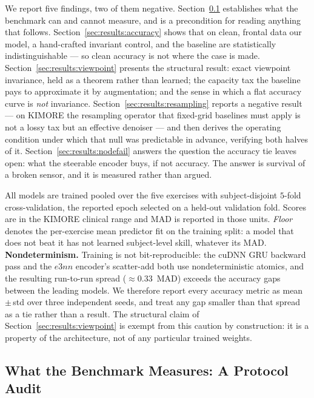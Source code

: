\documentclass[10pt,journal]{IEEEtran}
\begin{document}
We report five findings, two of them negative. Section~\ref{sec:results:protocol} establishes what
the benchmark can and cannot measure, and is a precondition for reading anything that follows.
Section~\ref{sec:results:accuracy} shows that on clean, frontal data our model, a hand-crafted
invariant control, and the baseline are statistically indistinguishable --- so clean accuracy is
not where the case is made. Section~\ref{sec:results:viewpoint} presents the structural result:
exact viewpoint invariance, held as a theorem rather than learned; the capacity tax the baseline
pays to approximate it by augmentation; and the sense in which a flat accuracy curve is
\emph{not} invariance. Section~\ref{sec:results:resampling} reports a negative result --- on KIMORE
the resampling operator that fixed-grid baselines must apply is not a lossy tax but an effective
denoiser --- and then derives the operating condition under which that null was predictable in
advance, verifying both halves of it. Section~\ref{sec:results:nodefail} answers the question the
accuracy tie leaves open: what the steerable encoder buys, if not accuracy. The answer is survival
of a broken sensor, and it is measured rather than argued.

All models are trained pooled over the five exercises with subject-disjoint $5$-fold
cross-validation, the reported epoch selected on a held-out validation fold. Scores are in the
KIMORE clinical range and MAD is reported in those units. \emph{Floor} denotes the per-exercise
mean predictor fit on the training split: a model that does not beat it has not learned
subject-level skill, whatever its MAD. \textbf{Nondeterminism.} Training is not bit-reproducible:
the cuDNN GRU backward pass and the $e3nn$ encoder's scatter-add both use nondeterministic atomics,
and the resulting run-to-run spread ($\approx\!0.33$~MAD) exceeds the accuracy gaps between the
leading models. We therefore report every accuracy metric as mean\,$\pm$\,std over three independent
seeds, and treat any gap smaller than that spread as a tie rather than a result. The structural
claim of Section~\ref{sec:results:viewpoint} is exempt from this caution by construction: it is a
property of the architecture, not of any particular trained weights.

\subsection{What the Benchmark Measures: A Protocol Audit}
\label{sec:results:protocol}
\end{document}
